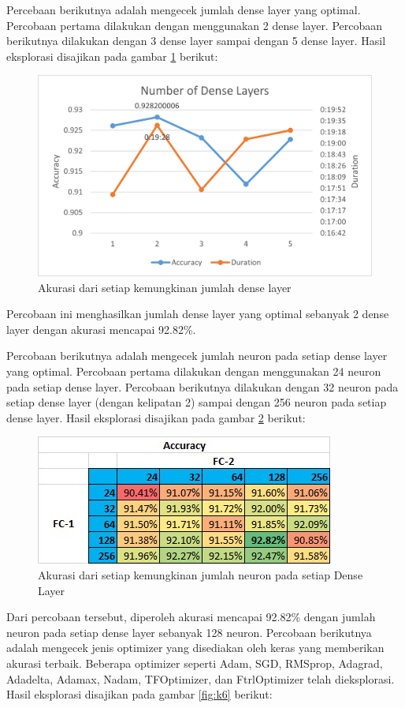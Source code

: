 \documentclass[a4, 12px]{article}
\theoremstyle{definition}
\theoremstyle{remark}
\begin{document}
Percebaan berikutnya adalah mengecek jumlah dense layer yang optimal. Percobaan pertama dilakukan dengan menggunakan 2 dense layer. Percobaan berikutnya dilakukan dengan 3 dense layer sampai dengan 5 dense layer. Hasil eksplorasi disajikan pada gambar \ref{fig:k4} berikut:

\begin{figure}[!h]
	\centering
	\includegraphics[width=0.7\linewidth]{src/K4}
	\caption{Akurasi dari setiap kemungkinan jumlah dense layer}
	\label{fig:k4}
\end{figure}

Percobaan ini menghasilkan jumlah dense layer yang optimal sebanyak 2 dense layer dengan akurasi mencapai 92.82\%.

Percobaan berikutnya adalah mengecek jumlah neuron pada setiap dense layer yang optimal. Percobaan pertama dilakukan dengan menggunakan 24 neuron pada setiap dense layer. Percobaan berikutnya dilakukan dengan 32 neuron pada setiap dense layer (dengan kelipatan 2) sampai dengan 256 neuron pada setiap dense layer. Hasil eksplorasi disajikan pada gambar \ref{fig:k5} berikut:

\begin{figure}[!h]
	\centering
	\includegraphics[width=0.7\linewidth]{src/K5}
	\caption{Akurasi dari setiap kemungkinan jumlah neuron pada setiap Dense Layer}
	\label{fig:k5}
\end{figure}

Dari percobaan tersebut, diperoleh akurasi mencapai 92.82\% dengan jumlah neuron pada setiap dense layer sebanyak 128 neuron.
Percobaan berikutnya adalah mengecek jenis optimizer yang disediakan oleh keras yang memberikan akurasi terbaik. Beberapa optimizer seperti Adam, SGD, RMSprop, Adagrad, Adadelta, Adamax, Nadam, TFOptimizer, dan FtrlOptimizer telah dieksplorasi. Hasil eksplorasi disajikan pada gambar \ref{fig:k6} berikut:
\end{document}
